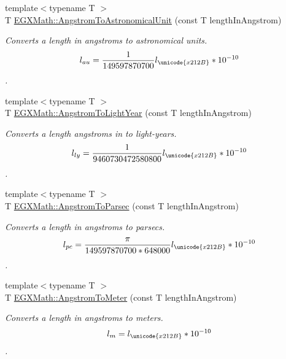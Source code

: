 \begin{DoxyCompactItemize}
\item 
{\footnotesize template$<$typename T $>$ }\\T \mbox{\hyperlink{group___e_g_x_math-_conversions-_length_conversions-_non-_s_i-_angstrom-_astronomical_ga3e524fe9f8c68c596264d4745b993be8}{E\+G\+X\+Math\+::\+Angstrom\+To\+Astronomical\+Unit}} (const T length\+In\+Angstrom)
\begin{DoxyCompactList}\small\item\em Converts a length in angstroms to astronomical units. \[ l_{au}= \frac{1}{149597870700} l_{\unicode{x212B}} * 10^{-10} \]. \end{DoxyCompactList}\item 
{\footnotesize template$<$typename T $>$ }\\T \mbox{\hyperlink{group___e_g_x_math-_conversions-_length_conversions-_non-_s_i-_angstrom-_astronomical_ga3ab9080fa3beaf5bbc5ea60323ff3634}{E\+G\+X\+Math\+::\+Angstrom\+To\+Light\+Year}} (const T length\+In\+Angstrom)
\begin{DoxyCompactList}\small\item\em Converts a length angstroms in to light-\/years. \[ l_{ly}= \frac{1}{9460730472580800} l_{\unicode{x212B}} * 10^{-10} \]. \end{DoxyCompactList}\item 
{\footnotesize template$<$typename T $>$ }\\T \mbox{\hyperlink{group___e_g_x_math-_conversions-_length_conversions-_non-_s_i-_angstrom-_astronomical_ga590d77221fd449be2e65f24f8d14a6d5}{E\+G\+X\+Math\+::\+Angstrom\+To\+Parsec}} (const T length\+In\+Angstrom)
\begin{DoxyCompactList}\small\item\em Converts a length in angstroms to parsecs. \[ l_{pc}=\frac{\pi}{149597870700 * 648000} l_{\unicode{x212B}} * 10^{-10} \]. \end{DoxyCompactList}\item 
{\footnotesize template$<$typename T $>$ }\\T \mbox{\hyperlink{group___e_g_x_math-_conversions-_length_conversions-_non-_s_i-_angstrom-_s_i_ga342cd009d104ec283921cd70841d500f}{E\+G\+X\+Math\+::\+Angstrom\+To\+Meter}} (const T length\+In\+Angstrom)
\begin{DoxyCompactList}\small\item\em Converts a length in angstroms to meters. \[ l_{m}=l_{\unicode{x212B}} * 10^{-10} \]. \end{DoxyCompactList}\item 

\end{DoxyCompactItemize}
